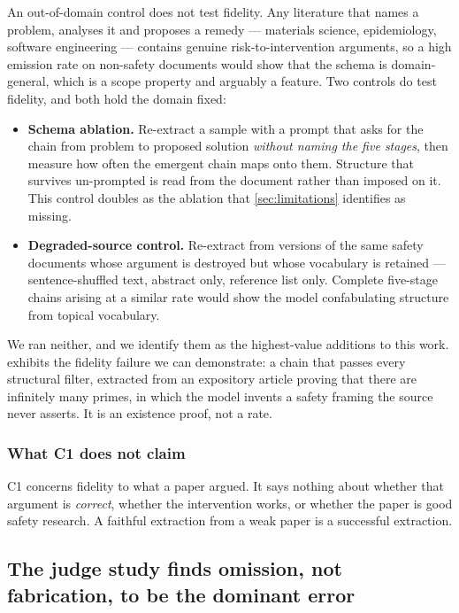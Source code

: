 \documentclass[10pt,twocolumn,letterpaper]{article}
\begin{document}
An out-of-domain control does not test fidelity. Any literature that names a problem,
analyses it and proposes a remedy --- materials science, epidemiology, software
engineering --- contains genuine risk-to-intervention arguments, so a high emission rate
on non-safety documents would show that the schema is domain-general, which is a scope
property and arguably a feature. Two controls do test fidelity, and both hold the domain
fixed:

\begin{itemize}
\setlength{\itemsep}{1pt}
\item \textbf{Schema ablation.} Re-extract a sample with a prompt that asks for the
chain from problem to proposed solution \emph{without naming the five stages}, then
measure how often the emergent chain maps onto them. Structure that survives un-prompted
is read from the document rather than imposed on it. This control doubles as the
ablation that \cref{sec:limitations} identifies as missing.
\item \textbf{Degraded-source control.} Re-extract from versions of the same safety
documents whose argument is destroyed but whose vocabulary is retained ---
sentence-shuffled text, abstract only, reference list only. Complete five-stage chains
arising at a similar rate would show the model confabulating structure from topical
vocabulary.
\end{itemize}

We ran neither, and we identify them as the highest-value additions to this work.
 exhibits the fidelity failure we can demonstrate: a chain that passes
every structural filter, extracted from an expository article proving that there are
infinitely many primes, in which the model invents a safety framing the source never
asserts. It is an existence proof, not a rate.

\subsubsection{What C1 does not claim}

C1 concerns fidelity to what a paper argued. It says nothing about whether that argument
is \emph{correct}, whether the intervention works, or whether the paper is good safety
research. A faithful extraction from a weak paper is a successful extraction.

\subsection{The judge study finds omission, not fabrication, to be the dominant error}
\label{sec:r-judge}
\end{document}
